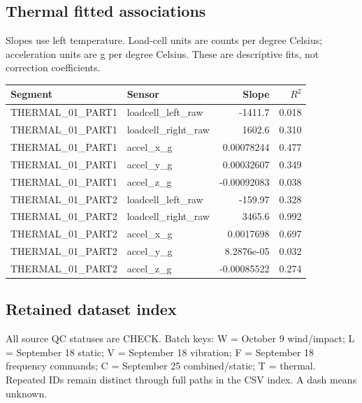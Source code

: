 \documentclass[10pt,letterpaper]{article}
\begin{document}
\subsection*{Thermal fitted associations}
Slopes use left temperature. Load-cell units are counts per degree Celsius; acceleration units are g per degree Celsius. These are descriptive fits, not correction coefficients.

\small\begin{longtable}{p{}p{}rr}\toprule Segment & Sensor & Slope & $R^2$\\\midrule\endhead
THERMAL\_01\_PART1 & loadcell\_left\_raw & -1411.7 & 0.018\\
THERMAL\_01\_PART1 & loadcell\_right\_raw & 1602.6 & 0.310\\
THERMAL\_01\_PART1 & accel\_x\_g & 0.00078244 & 0.477\\
THERMAL\_01\_PART1 & accel\_y\_g & 0.00032607 & 0.349\\
THERMAL\_01\_PART1 & accel\_z\_g & -0.00092083 & 0.038\\
THERMAL\_01\_PART2 & loadcell\_left\_raw & -159.97 & 0.328\\
THERMAL\_01\_PART2 & loadcell\_right\_raw & 3465.6 & 0.992\\
THERMAL\_01\_PART2 & accel\_x\_g & 0.0017698 & 0.697\\
THERMAL\_01\_PART2 & accel\_y\_g & 8.2876e-05 & 0.032\\
THERMAL\_01\_PART2 & accel\_z\_g & -0.00085522 & 0.274\\
\bottomrule\end{longtable}\normalsize
\clearpage\subsection*{Retained dataset index}
All source QC statuses are CHECK. Batch keys: W = October 9 wind/impact; L = September 18 static; V = September 18 vibration; F = September 18 frequency commands; C = September 25 combined/static; T = thermal. Repeated IDs remain distinct through full paths in the CSV index. A dash means unknown.
\end{document}
